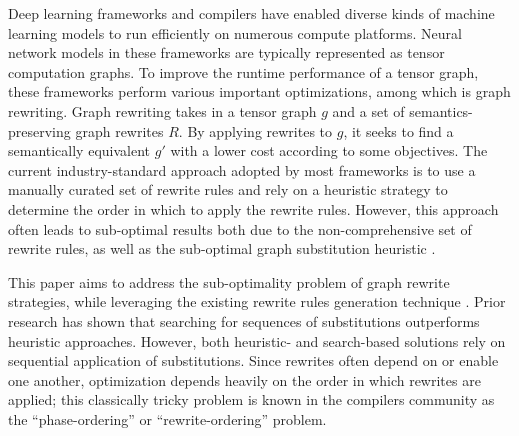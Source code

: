 \documentclass{article}
\begin{document}
Deep learning frameworks and compilers 
have enabled diverse kinds of machine learning models to run efficiently on numerous compute platforms. Neural network models in these frameworks are  typically represented as tensor computation graphs. To improve the runtime performance of a tensor graph, these frameworks perform various important optimizations, among which is graph rewriting.
Graph rewriting takes in a tensor graph $g$ and a set of semantics-preserving graph rewrites $R$.
By applying rewrites to $g$, it seeks to find a semantically equivalent $g'$ with a lower cost according to some objectives.
The current industry-standard approach adopted by most frameworks is to use a manually curated set of rewrite rules and rely on a heuristic strategy to determine the order in which to apply the rewrite rules.
However, this approach often leads to sub-optimal results both due to the non-comprehensive set of rewrite rules, as well as the sub-optimal graph substitution heuristic \cite{taso,metaflow}. %

This paper aims to address the sub-optimality problem of graph rewrite strategies, while leveraging the existing rewrite rules generation technique \cite{taso}.
Prior research has shown that searching for sequences of substitutions
\cite{taso,metaflow,Fang:sampling} outperforms heuristic approaches.
However, both heuristic- and search-based solutions rely on sequential application of substitutions.
Since rewrites often depend on or enable one another, 
optimization depends heavily on the order in which rewrites are applied;
this classically tricky problem is known in the compilers community as the ``phase-ordering'' or ``rewrite-ordering'' problem.
\end{document}
